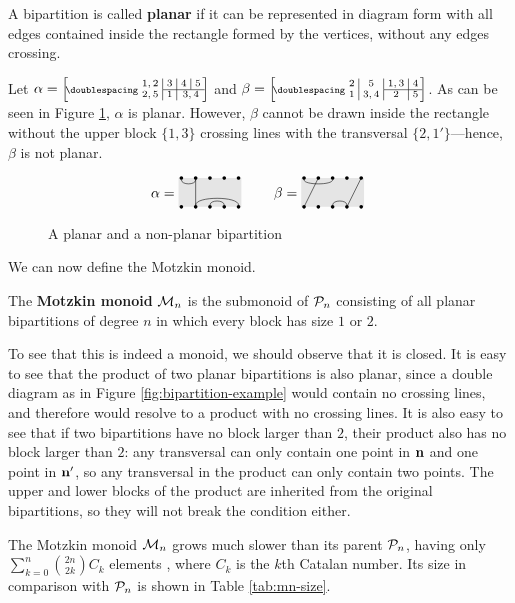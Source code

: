 \begin{definition}
  \label{def:planar}
  A bipartition is called \textbf{planar} if it can be represented in diagram
  form with all edges contained inside the rectangle formed by the vertices,
  without any edges crossing.
\end{definition}

\begin{example}
  Let $\alpha = \bipart{c|c|c|c}{2-4}{1,2 &3 &4 &5}{2,5 &1 &\mc2{c}{3,4}}$ and
  $\beta = \bipart{c|c|c|c}{3-4}{2 &5 &1,3 &4}{1 &3,4 &2 &5}$.  As can be seen
  in Figure \ref{fig:planar}, $\alpha$ is planar.  However, $\beta$ cannot be
  drawn inside the rectangle without the upper block $\{1,3\}$ crossing lines
  with the transversal $\{2, 1'\}$---hence, $\beta$ is not planar.
\end{example}

\begin{figure}[h]
  \centering
  $$\alpha = \bipartdiag{\tc12\tv22\bC25 \bc34} \qquad
  \beta = \bipartdiag{\tc13 \tv21 \tv54\bc34}$$
  \caption{A planar and a non-planar bipartition}
  \label{fig:planar}
\end{figure}

We can now define the Motzkin monoid.

\begin{definition}
  \label{def:motzkin}
  The \textbf{Motzkin monoid} $\mathcal{M}_n$ is the submonoid of $\mathcal{P}_n$ consisting
  of all planar bipartitions of degree $n$ in which every block has size $1$ or
  $2$.
\end{definition}

To see that this is indeed a monoid, we should observe that it is closed.  It is
easy to see that the product of two planar bipartitions is also planar, since a
double diagram as in Figure \ref{fig:bipartition-example} would contain no
crossing lines, and therefore would resolve to a product with no crossing lines.
It is also easy to see that if two bipartitions have no block larger than $2$,
their product also has no block larger than $2$: any transversal can only
contain one point in $\mathbf{n}$ and one point in $\mathbf{n}'$, so any transversal in the
product can only contain two points.  The upper and lower blocks of the product
are inherited from the original bipartitions, so they will not break the
condition either.

The Motzkin monoid $\mathcal{M}_n$ grows much slower than its parent $\mathcal{P}_n$, having
only $\sum_{k=0}^n \binom{2n}{2k}C_k$ elements
, where $C_k$ is the $k$th
Catalan number.  Its size in comparison with $\mathcal{P}_n$ is shown in Table
\ref{tab:mn-size}.

